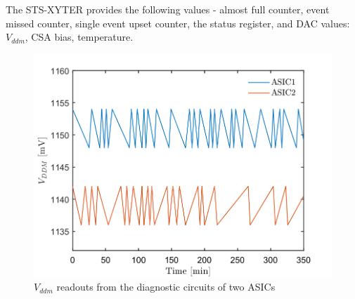 The STS-XYTER provides the following values - almost full counter, event missed counter, single event upset counter, the status register, and \gls{DAC} values: $V_{ddm}$, \gls{CSA} bias, temperature. 

\begin{figure}[!h]
    \centering
    \includegraphics[width=0.65\columnwidth]{Chapter4/images/FEB.png}
    \caption{$V_{ddm}$ readouts from the diagnostic circuits of two ASICs}
    \label{fig:vddm_first}
\end{figure}

